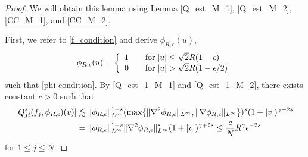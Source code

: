 \documentclass[reqno,10pt]{amsart}
\numberwithin{equation}{section}
\begin{document}
\begin{proof}
We will obtain this lemma using Lemma \ref{Q_est_M_1}, \ref{Q_est_M_2}, \ref{CC_M_1}, and \ref{CC_M_2}. \vspace{3mm}

\noindent First, we refer to \eqref{f_condition} and derive $\phi_{R,\epsilon}(u)$,
\begin{align*}
    \phi_{R,\epsilon}(u) =
     \left\{ \begin{array}{rcl}1 & \mbox{for} \; |u| \leq \sqrt{2}R(1-\epsilon)\\
0 & \mbox{\quad for} \;|u|> \sqrt{2}R(1-\epsilon/2)
\end{array}\right.
\end{align*}
such that \eqref{phi condition}.
By \eqref{Q_est_1_M_1} and \eqref{Q_est_1_M_2}, there exists constant $c>0$ such that 
\begin{align}
  |Q_{ji}^{s}(f_j,\phi_{R,\epsilon})(v)| 
    &\lesssim
  \|\phi_{R,\epsilon}\|_{L^{\infty}}^{1-s}(\text{max}\{\|\nabla^2 \phi_{R,\epsilon}\|_{L^\infty}, \|\nabla \phi_{R,\epsilon}\|_{L^\infty} \})^{s}(1+|v|)^{\gamma+2s} \notag \\
  &= \|\phi_{R,\epsilon}\|_{L^{\infty}}^{1-s}\|\nabla^2 \phi_{R,\epsilon}\|_{L^\infty}^{s}(1+|v|)^{\gamma+2s}
  \leq \frac{c}{N}R^\gamma \epsilon^{-2s} \label{Qs_est_spreading_M}
\end{align} for $1 \leq j \leq N$. \vspace{4mm}


\end{proof}
\end{document}
